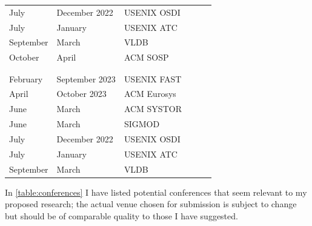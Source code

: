 \begin{table}
{\begin{tabular}{p{4cm}p{4cm}p{4cm}ccl}
            July                      & December 2022     & USENIX OSDI  \\
            July                      & January           & USENIX ATC   \\
            September                 & March             & VLDB         \\
            October                   & April             & ACM SOSP     \\
            \\
            \rowcolor[rgb]{ .751,  .751,  .751}\multicolumn{3}{c}{2024}  \\
            February                  & September 2023    & USENIX FAST  \\
            April                     & October 2023      & ACM Eurosys  \\
            June                      & March             & ACM SYSTOR   \\
            June                      & March             & SIGMOD       \\
            July                      & December 2022     & USENIX OSDI  \\
            July                      & January           & USENIX ATC   \\
            September                 & March             & VLDB         \\
        \end{tabular}
    }
\end{table}

In \autoref{table:conferences} I have listed potential conferences that seem
relevant to my proposed research; the actual venue chosen for submission is
subject to change but should be of comparable quality to those I have suggested.
